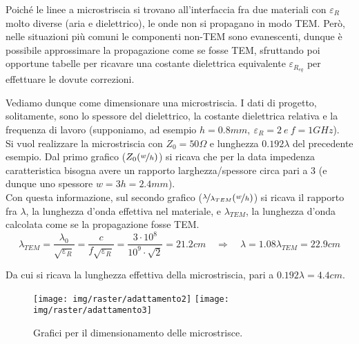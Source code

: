Poiché le linee a microstriscia si trovano all'interfaccia fra due materiali con $\varepsilon_R$ molto diverse (aria e dielettrico), le onde non si propagano in modo TEM. Però, nelle situazioni più comuni le componenti non-TEM sono evanescenti, dunque è possibile approssimare la propagazione come se fosse TEM, sfruttando poi opportune tabelle per ricavare una costante dielettrica equivalente $\varepsilon_{R_{eq}}$ per effettuare le dovute correzioni.

Vediamo dunque come dimensionare una microstriscia. I dati di progetto, solitamente, sono lo spessore del dielettrico, la costante dielettrica relativa e la frequenza di lavoro (supponiamo, ad esempio $h=0.8mm, \ \varepsilon_R = 2 \ e\ f=1GHz$).\\
Si vuol realizzare la microstriscia con $Z_0=50\Omega$ e lunghezza $0.192\lambda$ del precedente esempio. Dal primo grafico ($Z_0(\nicefrac{w}{h})$) si ricava che per la data impedenza caratteristica bisogna avere un rapporto larghezza/spessore circa pari a 3 (e dunque uno spessore $w = 3h = 2.4mm$).\\
Con questa informazione, sul secondo grafico ($\nicefrac{\lambda}{\lambda_{TEM}}(\nicefrac{w}{h})$) si ricava il rapporto fra $\lambda$, la lunghezza d'onda effettiva nel materiale, e $\lambda_{TEM}$, la lunghezza d'onda calcolata come se la propagazione fosse TEM.
\[
\lambda_{TEM} = \frac{\lambda_0}{\sqrt{\varepsilon_R}}
=
\frac{c}{f \sqrt{\varepsilon_R}}
= \frac{3\cdot10^8}{10^9 \cdot \sqrt{2}} = 21.2 cm
\quad
\Rightarrow
\quad
\lambda = 1.08 \lambda_{TEM} = 22.9cm
\]

Da cui si ricava la lunghezza effettiva della microstriscia, pari a $0.192\lambda = 4.4 cm$.


\begin{figure}[hbt]
	\centering
	\texttt{[image: img/raster/adattamento2]}
	\texttt{[image: img/raster/adattamento3]}
	\caption{Grafici per il dimensionamento delle microstrisce.}
	\label{fig:microstriscia-grafici}
\end{figure}
%
%
%
%

